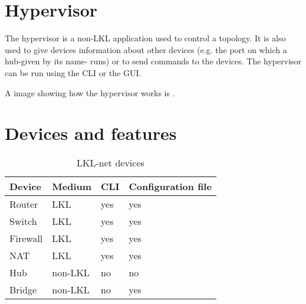 \section{Hypervisor}
\label{sub-sec:hypervisor}
The hypervisor is a non-LKL application used to control a topology. It is also used to give devices information 
about other devices (e.g. the port on which a hub-given by its name- runs) or to send commands to the devices. 
The hypervisor can be run using the CLI or the GUI.

A image showing how the hypervisor works is . 

\section{Devices and features}
\begin{center}
  \begin{table}[htb]
  \begin{center}
  \begin{tabular}{ | l | l | l | l |}
    \hline
      \textbf{Device} & \textbf{Medium} & \textbf{CLI} & \textbf{Configuration file}}\\ \hline
      Router & LKL & yes & yes\\ \hline
      Switch & LKL & yes & yes\\ \hline
      Firewall & LKL & yes & yes\\ \hline
      NAT & LKL & yes & yes\\ \hline
      Hub & non-LKL & no & no\\ \hline
      Bridge & non-LKL & no & yes\\ 
    \hline
  \end{tabular}
  \end{center}
  \caption{LKL-net devices}
  \label{table:tdevices}
  \end{table}
\end{center}
